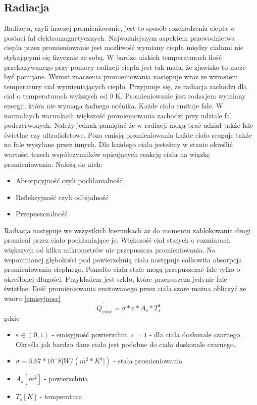\subsection {Radiacja}
\label{Radiacja}
Radiacja, czyli inaczej promieniowanie, jest to sposób rozchodzenia ciepła w postaci fal elektromagnetycznych. 
Najważniejszym aspektem przewodnictwa ciepła przez promieniowanie jest możliwość wymiany ciepła między ciałami
nie stykającymi się fizycznie ze sobą.
W bardzo niskich temperaturach ilość przekazywanego przy pomocy radiacji ciepła jest tak mała, że zjawisko to może być pomijane.
Wzrost znaczenia promieniowania następuje wraz ze wzrostem temperatury ciał wymieniających ciepło.
Przyjmuje się, że radiacja zachodzi dla ciał o temperaturach wyższych od $0$ K. %
Promieniowanie jest rodzajem wymiany energii, która nie wymaga żadnego nośnika. Każde ciało emituje fale.
W normalnych warunkach większość promieniowania zachodzi przy udziale fal podczerwonych. Należy jednak pamiętać
że w radiacji mogą brać udział także fale świetlne czy ultrafioletowe. Poza emisją promieniowania każde ciało reaguje także
na fale wysyłane przez innych. Dla każdego ciała jesteśmy w stanie określić wartości trzech współczynników opisujących 
reakcję ciała na wiązkę promieniowania. Należą do nich:
\begin {itemize}
\item Absorpcyjność czyli pochłanialność
\item Refleksyjność czyli odbijalność
\item Przepuszczalność
\end {itemize}
Radiacja następuje we wszystkich kierunkach aż do momentu zablokowania drogi promieni przez ciało pochłaniające je.
Większość ciał stałych o rozmiarach większych od kilku mikrometrów nie przepuszcza promieniowania. Na wspomnianej 
głębokości pod powierzchnią ciała następuje całkowita absorpcja promieniowania cieplnego. Ponadto ciała stałe mogą przepuszczać
fale tylko o określonej długości. Przykładem jest szkło, które przepuszcza jedynie fale świetlne.
Ilość promieniowania emitowanego przez ciała szare można obliczyć ze wzoru \ref{emisyjnosc}
\begin {equation}
\dot{Q_{emit}}=\sigma*\varepsilon*A_{s}*T_{s}^4
\label {emisyjnosc}
\end {equation}
gdzie
\begin{itemize}
\item $\varepsilon \in (0,1)$ - emisyjność powierzchni. $\varepsilon=1$ - dla ciała doskonale czarnego. Określa jak bardzo dane 
ciało jest podobne do ciała doskonale czarnego.
\item $\sigma = 5.67 * 10^-8 [W/(m^2 * K^4]) $ - stała promieniowania
\item $A_{s} [m^2]$ - powierzchnia 
\item $T_{s} [K]$ - temperatura
\end {itemize}
